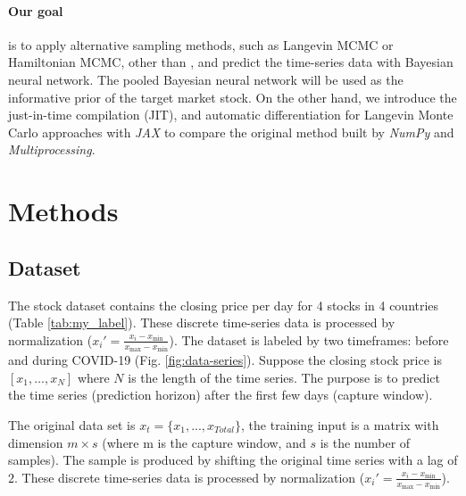 \documentclass{article}
\begin{document}
\paragraph{Our goal} is to apply alternative sampling methods, such as Langevin MCMC or Hamiltonian MCMC, other than \cite{chandra2019langevin}, and predict the time-series data with Bayesian neural network. The pooled Bayesian neural network will be used as the informative prior of the target market stock. On the other hand, we introduce the just-in-time compilation (JIT), and automatic differentiation for Langevin Monte Carlo approaches with \textit{JAX}\cite{jax2018github} to compare the original method built by \textit{NumPy} and \textit{Multiprocessing}\cite{chandra2021bayesian}. %



\section{Methods}


\subsection{Dataset}

The stock dataset contains the closing price per day for 4 stocks in 4 countries (Table \ref{tab:my_label}). These discrete time-series data is processed by normalization ($x_{i}' = \frac{x_{i} - x_{\min}}{x_{\max} - x_{\min}}$). The dataset is labeled by two timeframes: before and during COVID-19 (Fig. \ref{fig:data-series}). Suppose the closing stock price is $[x_1, \dots, x_N]$ where $N$ is the length of the time series. The purpose is to predict the time series (prediction horizon) after the first few days (capture window).



The original data set is $x_t = \{x_{1}, ..., x_{Total}\}$, the training input is a matrix with dimension $m \times s$ (where m is the capture window, and $s$ is the number of samples). The sample is produced by shifting the original time series with a lag of $2$.  These discrete time-series data is processed by normalization ($x_{i}' = \frac{x_{i} - x_{\min}}{x_{\max} - x_{\min}}$). 
\end{document}
